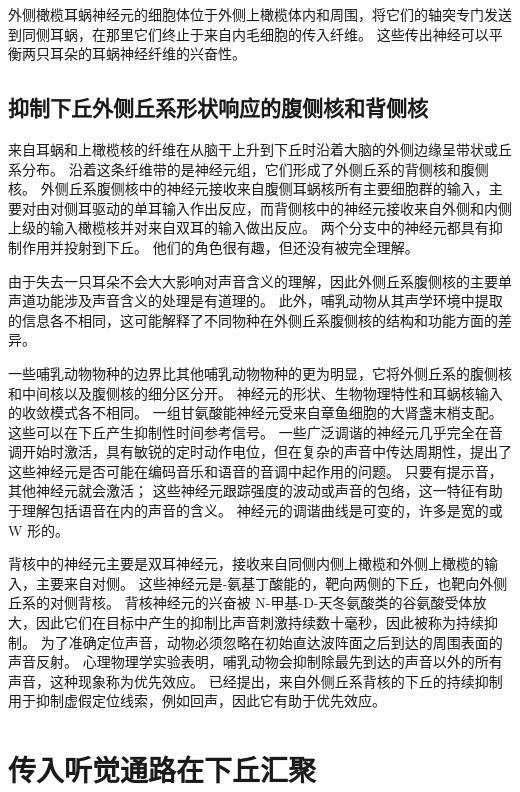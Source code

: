 外侧橄榄耳蜗神经元的细胞体位于外侧上橄榄体内和周围，将它们的轴突专门发送到同侧耳蜗，在那里它们终止于来自内毛细胞的传入纤维。
这些传出神经可以平衡两只耳朵的耳蜗神经纤维的兴奋性\cite{darrow2006cochlear}。



\subsection{抑制下丘外侧丘系形状响应的腹侧核和背侧核}

来自耳蜗和上橄榄核的纤维在从脑干上升到下丘时沿着大脑的外侧边缘呈带状或丘系分布。
沿着这条纤维带的是神经元组，它们形成了外侧丘系的背侧核和腹侧核。
外侧丘系腹侧核中的神经元接收来自腹侧耳蜗核所有主要细胞群的输入，主要对由对侧耳驱动的单耳输入作出反应，而背侧核中的神经元接收来自外侧和内侧上级的输入橄榄核并对来自双耳的输入做出反应。
两个分支中的神经元都具有抑制作用并投射到下丘。
他们的角色很有趣，但还没有被完全理解。


由于失去一只耳朵不会大大影响对声音含义的理解，因此外侧丘系腹侧核的主要单声道功能涉及声音含义的处理是有道理的。
此外，哺乳动物从其声学环境中提取的信息各不相同，这可能解释了不同物种在外侧丘系腹侧核的结构和功能方面的差异。


一些哺乳动物物种的边界比其他哺乳动物物种的更为明显，它将外侧丘系的腹侧核和中间核以及腹侧核的细分区分开。
神经元的形状、生物物理特性和耳蜗核输入的收敛模式各不相同。
一组甘氨酸能神经元受来自章鱼细胞的大肾盏末梢支配。 
这些可以在下丘产生抑制性时间参考信号。
一些广泛调谐的神经元几乎完全在音调开始时激活，具有敏锐的定时动作电位，但在复杂的声音中传达周期性，提出了这些神经元是否可能在编码音乐和语音的音调中起作用的问题。
只要有提示音，其他神经元就会激活； 
这些神经元跟踪强度的波动或声音的包络，这一特征有助于理解包括语音在内的声音的含义。
神经元的调谐曲线是可变的，许多是宽的或 W 形的。


背核中的神经元主要是双耳神经元，接收来自同侧内侧上橄榄和外侧上橄榄的输入，主要来自对侧。
这些神经元是\ce{$\gamma$}-氨基丁酸能的，靶向两侧的下丘，也靶向外侧丘系的对侧背核。
背核神经元的兴奋被 N-甲基-D-天冬氨酸类的谷氨酸受体放大，因此它们在目标中产生的抑制比声音刺激持续数十毫秒，因此被称为持续抑制。
为了准确定位声音，动物必须忽略在初始直达波阵面之后到达的周围表面的声音反射。
心理物理学实验表明，哺乳动物会抑制除最先到达的声音以外的所有声音，这种现象称为优先效应。
已经提出，来自外侧丘系背核的下丘的持续抑制用于抑制虚假定位线索，例如回声，因此它有助于优先效应。


\section{传入听觉通路在下丘汇聚}

